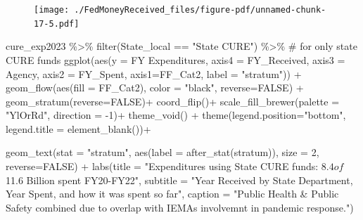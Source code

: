 \documentclass[
  letterpaper,
  DIV=11,
  numbers=noendperiod]{scrreport}
\newenvironment{Shaded}{\begin{snugshade}}{\end{snugshade}}
\newcommand{\AttributeTok}[1]{\textcolor[rgb]{0.40,0.45,0.13}{#1}}
\newcommand{\CommentTok}[1]{\textcolor[rgb]{0.37,0.37,0.37}{#1}}
\newcommand{\ConstantTok}[1]{\textcolor[rgb]{0.56,0.35,0.01}{#1}}
\newcommand{\DecValTok}[1]{\textcolor[rgb]{0.68,0.00,0.00}{#1}}
\newcommand{\FunctionTok}[1]{\textcolor[rgb]{0.28,0.35,0.67}{#1}}
\newcommand{\NormalTok}[1]{\textcolor[rgb]{0.00,0.23,0.31}{#1}}
\newcommand{\SpecialCharTok}[1]{\textcolor[rgb]{0.37,0.37,0.37}{#1}}
\newcommand{\StringTok}[1]{\textcolor[rgb]{0.13,0.47,0.30}{#1}}
\begin{document}
\begin{figure}[H]

{\centering \texttt{[image: ./FedMoneyReceived\_files/figure-pdf/unnamed-chunk-17-5.pdf]}

}

\end{figure}

\begin{Shaded}
\begin{Highlighting}[]
\NormalTok{cure\_exp2023 }\SpecialCharTok{\%\textgreater{}\%} 
  \FunctionTok{filter}\NormalTok{(State\_local }\SpecialCharTok{==} \StringTok{"State CURE"}\NormalTok{) }\SpecialCharTok{\%\textgreater{}\%} \CommentTok{\# for only state CURE funds}
  \FunctionTok{ggplot}\NormalTok{(}\FunctionTok{aes}\NormalTok{(}\AttributeTok{y =} \StringTok{\textasciigrave{}}\AttributeTok{FY Expenditures}\StringTok{\textasciigrave{}}\NormalTok{, }\AttributeTok{axis4 =}\NormalTok{ FY\_Received, }\AttributeTok{axis3 =} \StringTok{\textasciigrave{}}\AttributeTok{Agency}\StringTok{\textasciigrave{}}\NormalTok{,  }
             \AttributeTok{axis2 =}\NormalTok{ FY\_Spent, }\AttributeTok{axis1=}\NormalTok{FF\_Cat2, }\AttributeTok{label =} \StringTok{"stratum"}\NormalTok{)) }\SpecialCharTok{+}
  \FunctionTok{geom\_flow}\NormalTok{(}\FunctionTok{aes}\NormalTok{(}\AttributeTok{fill =}\NormalTok{ FF\_Cat2), }\AttributeTok{color =} \StringTok{"black"}\NormalTok{, }\AttributeTok{reverse=}\ConstantTok{FALSE}\NormalTok{) }\SpecialCharTok{+}
  \FunctionTok{geom\_stratum}\NormalTok{(}\AttributeTok{reverse=}\ConstantTok{FALSE}\NormalTok{)}\SpecialCharTok{+}
  \FunctionTok{coord\_flip}\NormalTok{()}\SpecialCharTok{+}
  \FunctionTok{scale\_fill\_brewer}\NormalTok{(}\AttributeTok{palette =} \StringTok{"YlOrRd"}\NormalTok{, }\AttributeTok{direction =} \SpecialCharTok{{-}}\DecValTok{1}\NormalTok{)}\SpecialCharTok{+}
  \FunctionTok{theme\_void}\NormalTok{() }\SpecialCharTok{+} 
  \FunctionTok{theme}\NormalTok{(}\AttributeTok{legend.position=}\StringTok{"bottom"}\NormalTok{, }\AttributeTok{legend.title =} \FunctionTok{element\_blank}\NormalTok{())}\SpecialCharTok{+}
  
  \FunctionTok{geom\_text}\NormalTok{(}\AttributeTok{stat =} \StringTok{"stratum"}\NormalTok{, }\FunctionTok{aes}\NormalTok{(}\AttributeTok{label =} \FunctionTok{after\_stat}\NormalTok{(stratum)), }\AttributeTok{size =} \DecValTok{2}\NormalTok{, }\AttributeTok{reverse=}\ConstantTok{FALSE}\NormalTok{) }\SpecialCharTok{+}
  \FunctionTok{labs}\NormalTok{(}\AttributeTok{title =} \StringTok{"Expenditures using State CURE funds: $8.4 of $11.6 Billion spent FY20{-}FY22"}\NormalTok{, }
  \AttributeTok{subtitle =} \StringTok{"Year Received by State Department, Year Spent, and how it was spent so far"}\NormalTok{, }
  \AttributeTok{caption =} \StringTok{"Public Health \& Public Safety combined due to overlap with IEMA\textquotesingle{}s involvemnt in pandemic response."}\NormalTok{)}
\end{Highlighting}
\end{Shaded}
\end{document}
